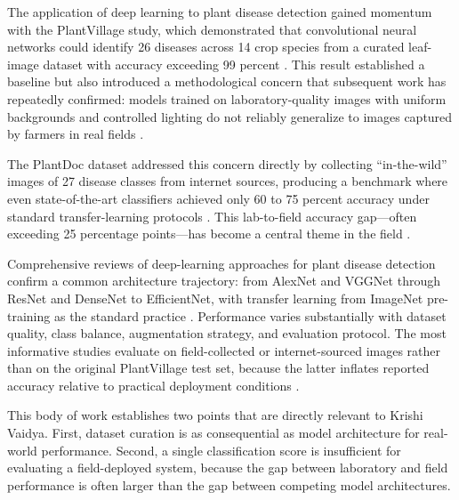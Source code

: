 

The application of deep learning to plant disease detection gained momentum with the PlantVillage
study, which demonstrated that convolutional neural networks could identify 26 diseases across
14 crop species from a curated leaf-image dataset with accuracy exceeding 99 percent
\parencite{mohanty2016plantvillage}. This result established a baseline but also introduced a
methodological concern that subsequent work has repeatedly confirmed: models trained on
laboratory-quality images with uniform backgrounds and controlled lighting do not reliably
generalize to images captured by farmers in real fields
\parencite{singhPlantDoc2020,thakurPlantDiseaseFieldGap2022}.

The PlantDoc dataset addressed this concern directly by collecting ``in-the-wild'' images of 27
disease classes from internet sources, producing a benchmark where even state-of-the-art
classifiers achieved only 60 to 75 percent accuracy under standard transfer-learning protocols
\parencite{singhPlantDoc2020}. This lab-to-field accuracy gap---often exceeding 25 percentage
points---has become a central theme in the field
\parencite{thakurPlantDiseaseFieldGap2022,li2021plantDiseaseReviewCNN}.

Comprehensive reviews of deep-learning approaches for plant disease detection confirm a common
architecture trajectory: from AlexNet and VGGNet through ResNet \parencite{heResNet2016} and
DenseNet to EfficientNet, with transfer learning from ImageNet pre-training as the standard
practice \parencite{saleem2019plantDiseaseML,liu2021plantDiseaseReview}. Performance varies
substantially with dataset quality, class balance, augmentation strategy, and evaluation
protocol. The most informative studies evaluate on field-collected or internet-sourced images
rather than on the original PlantVillage test set, because the latter inflates reported accuracy
relative to practical deployment conditions \parencite{thakurPlantDiseaseFieldGap2022}.

This body of work establishes two points that are directly relevant to Krishi Vaidya. First,
dataset curation is as consequential as model architecture for real-world performance. Second,
a single classification score is insufficient for evaluating a field-deployed system, because
the gap between laboratory and field performance is often larger than the gap between competing
model architectures.

